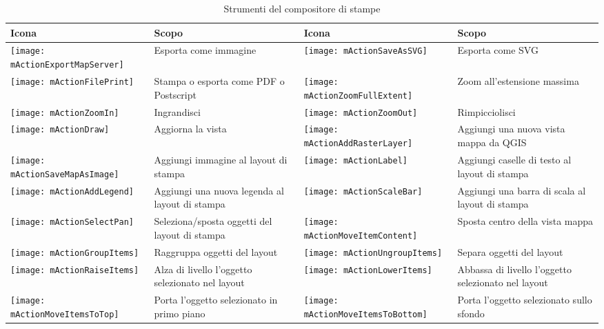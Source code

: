 \begin{table}[h]
\centering
\caption{Strumenti del compositore di stampe}\label{tab:printcomposer_tools}\medskip
 \begin{tabular}{|l|p{6.9cm}|l|p{6.9cm}|}
 \hline \textbf{Icona} & \textbf{Scopo} & \textbf{Icona} &
 \textbf{Scopo} \\

 \hline \texttt{[image: mActionExportMapServer]}
 & Esporta come immagine & 
 \texttt{[image: mActionSaveAsSVG]} & Esporta come SVG \\
 \hline \texttt{[image: mActionFilePrint]} & Stampa o esporta
 come PDF o Postscript &
 \texttt{[image: mActionZoomFullExtent]} & Zoom all'estensione
 massima \\
 \hline \texttt{[image: mActionZoomIn]} & Ingrandisci &
 \texttt{[image: mActionZoomOut]} & Rimpicciolisci \\
 \hline \texttt{[image: mActionDraw]} & Aggiorna la vista &
 \texttt{[image: mActionAddRasterLayer]} & Aggiungi una nuova
 vista mappa da QGIS \\
 \hline \texttt{[image: mActionSaveMapAsImage]} & Aggiungi
 immagine al layout di stampa &
 \texttt{[image: mActionLabel]} & Aggiungi caselle di testo al
 layout di stampa \\
 \hline \texttt{[image: mActionAddLegend]} & Aggiungi una nuova
 legenda al layout di stampa & 
 \texttt{[image: mActionScaleBar]} & Aggiungi una barra di scala
 al layout di stampa\\
 \hline \texttt{[image: mActionSelectPan]} & Seleziona/sposta
 oggetti del layout di stampa &
 \texttt{[image: mActionMoveItemContent]} & Sposta centro della
 vista mappa \\
 \hline \texttt{[image: mActionGroupItems]} & Raggruppa oggetti
 del layout & 
 \texttt{[image: mActionUngroupItems]} & Separa oggetti del
 layout \\
 \hline \texttt{[image: mActionRaiseItems]} & Alza di livello
 l'oggetto selezionato nel layout &
 \texttt{[image: mActionLowerItems]} & Abbassa di livello
 l'oggetto selezionato nel layout \\
 \hline \texttt{[image: mActionMoveItemsToTop]} & Porta l'oggetto
 selezionato in primo piano & 
 \texttt{[image: mActionMoveItemsToBottom]} & Porta l'oggetto
 selezionato sullo sfondo \\
\hline
\end{tabular}
\end{table}

